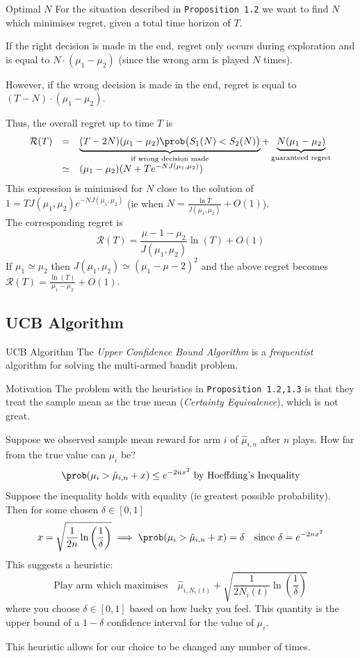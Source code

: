 \documentclass[11pt,a4paper]{article}
\begin{document}
\begin{proposition}{Optimal $N$}
  For the situation described in \texttt{Proposition 1.2} we want to find $N$ which minimises regret, given a total time horizon of $T$.
  \par If the right decision is made in the end, regret only occurs during exploration and is equal to $N\cdot(\mu_1-\mu_2)$ (since the wrong arm is played $N$ times).
  \par However, if the wrong decision is made in the end, regret is equal to $(T-N)\cdot(\mu_1-\mu_2)$.
  \par Thus, the overall regret up to time $T$ is
  \[\begin{array}{rcl}
    \mathcal{R}(T)&=&\underbrace{(T-2N)(\mu_1-\mu_2)\prob\big(S_1(N)<S_2(N)\big)}_{\tiny\text{if wrong decision made}}+\underbrace{N(\mu_1-\mu_2)}_{\tiny\text{guaranteed regret}}\\
    &\simeq&(\mu_1-\mu_2)(N+Te^{-NJ(\mu_1,\mu_2)})
  \end{array}\]
  This expression is minimised for $N$ close to the solution of $1=TJ(\mu_1,\mu_2)e^{-NJ(\mu_1,\mu_2)}$ (ie when $N=\frac{\ln T}{J(\mu_1,\mu_2)}+O(1)$).\\
  The corresponding regret is
  \[ \mathcal{R}(T)=\frac{\mu-1-\mu_2}{J(\mu_1,\mu_2)}\ln(T)+O(1) \]
  If $\mu_1\simeq\mu_2$ then $J(\mu_1,\mu_2)\simeq(\mu_1-\mu-2)^2$ and the above regret becomes $\mathcal{R}(T)=\frac{\ln(T)}{\mu_1-\mu_2}+O(1)$.
\end{proposition}

\subsection{UCB Algorithm}

\begin{remark}{UCB Algorithm}
  The \textit{Upper Confidence Bound Algorithm} is a \textit{frequentist} algorithm for solving the multi-armed bandit problem.
\end{remark}

\begin{remark}{Motivation}
  The problem with the heuristics in \texttt{Proposition 1.2,1.3} is that they treat the sample mean as the true mean (\textit{Certainty Equivalence}), which is not great.
  \par Suppose we observed sample mean reward for arm $i$ of $\hat\mu_{i,n}$ after $n$ plays. How far from the true value can $\mu_i$ be?
  \[ \prob(\mu_i>\hat\mu_{i,n}+x)\leq e^{-2nx^2}\text{ by Hoeffding's Inequality} \]
  Suppose the inequality holds with equality (ie greatest possible probability). Then for some chosen $\delta\in[0,1]$
  \[ x=\sqrt{\frac1{2n}\ln\left(\frac1\delta\right)}\implies \prob(\mu_i>\hat\mu_{i,n}+x)=\delta\quad\text{since }\delta=e^{-2nx^2} \]
  This suggests a heuristic:
  \[\text{Play arm which maximises}\quad\hat\mu_{i,N_{i}(t)}+\sqrt{\frac1{2N_i(t)}\ln\left(\frac1\delta\right)}\]
  where you choose $\delta\in[0,1]$ based on how lucky you feel. This quantity is the upper bound of a $1-\delta$ confidence interval for the value of $\mu_i$.
  \par This heuristic allows for our choice to be changed any number of times.
\end{remark}
\end{document}
